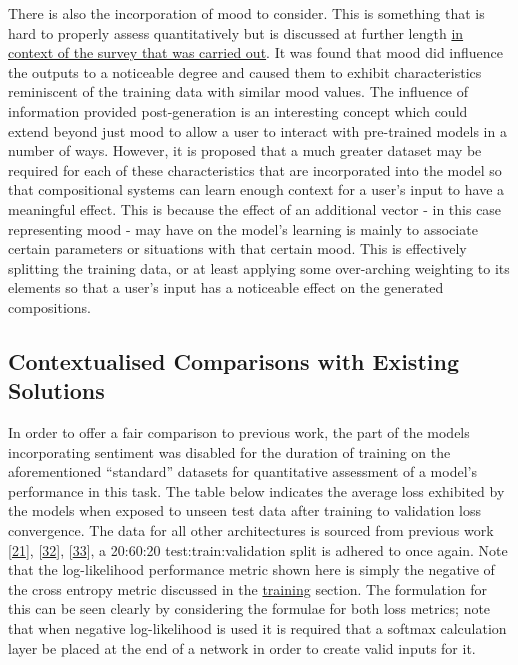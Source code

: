 \documentclass[12pt,]{article}
\begin{document}
There is also the incorporation of mood to consider. This is something
that is hard to properly assess quantitatively but is discussed at
further length \protect\hyperlink{qualitativesurveyingassessment}{in
context of the survey that was carried out}. It was found that mood did
influence the outputs to a noticeable degree and caused them to exhibit
characteristics reminiscent of the training data with similar mood
values. The influence of information provided post-generation is an
interesting concept which could extend beyond just mood to allow a user
to interact with pre-trained models in a number of ways. However, it is
proposed that a much greater dataset may be required for each of these
characteristics that are incorporated into the model so that
compositional systems can learn enough context for a user's input to
have a meaningful effect. This is because the effect of an additional
vector - in this case representing mood - may have on the model's
learning is mainly to associate certain parameters or situations with
that certain mood. This is effectively splitting the training data, or
at least applying some over-arching weighting to its elements so that a
user's input has a noticeable effect on the generated compositions.

\hypertarget{contextualised-comparisons-with-existing-solutions}{%
\subsection{Contextualised Comparisons with Existing
Solutions}\label{contextualised-comparisons-with-existing-solutions}}

In order to offer a fair comparison to previous work, the part of the
models incorporating sentiment was disabled for the duration of training
on the aforementioned ``standard'' datasets for quantitative assessment
of a model's performance in this task. The table below indicates the
average loss exhibited by the models when exposed to unseen test data
after training to validation loss convergence. The data for all other
architectures is sourced from previous work
{[}\protect\hyperlink{ref-boulanger2012modeling}{21}{]},
{[}\protect\hyperlink{ref-vohra2015modeling}{32}{]},
{[}\protect\hyperlink{ref-johnson2017generating}{33}{]}, a 20:60:20
test:train:validation split is adhered to once again. Note that the
log-likelihood performance metric shown here is simply the negative of
the cross entropy metric discussed in the
\protect\hyperlink{training}{training} section. The formulation for this
can be seen clearly by considering the formulae for both loss metrics;
note that when negative log-likelihood is used it is required that a
softmax calculation layer be placed at the end of a network in order to
create valid inputs for it.
\end{document}
